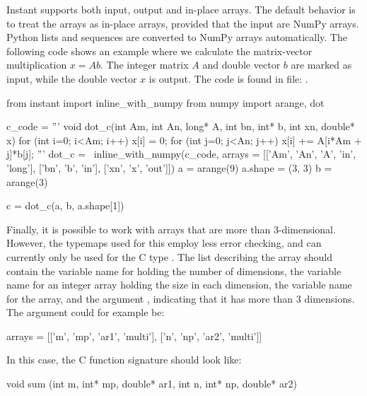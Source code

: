 Instant supports both input, output and in-place arrays. 
The default behavior is to treat the arrays as in-place arrays, provided  
that the input are NumPy arrays. Python lists and sequences are converted to NumPy arrays automatically.  
The following code shows an example where we calculate the matrix-vector
multiplication $x = Ab$. The integer matrix $A$ and double vector $b$ are marked as input, while 
the double vector $x$ is output. The code is found in 
file: . 
\begin{python}
from instant import inline_with_numpy
from numpy import arange, dot

c_code = '''
void dot_c(int Am, int An, long* A, int bn, int* b,
           int xn, double* x)
{
  for (int i=0; i<Am; i++)
  {
    x[i] = 0;
    for (int j=0; j<An; j++)
    {
      x[i] += A[i*Am + j]*b[j];
    }
  }
}
'''
dot_c = \
  inline_with_numpy(c_code,
                    arrays = [['Am', 'An', 'A', 'in', 'long'],
                              ['bn', 'b', 'in'],
                              ['xn', 'x', 'out']])
a = arange(9)
a.shape = (3, 3)
b = arange(3)

c = dot_c(a, b, a.shape[1])
\end{python}


Finally, it is possible to work with arrays that are more than 3-dimensional. 
However, the typemaps used for this employ less error checking, and
can currently only be used for the C type \emp{double}. The list describing the array
should contain the variable name for holding the number of dimensions, the
variable name for an integer array holding the size in each dimension, the
variable name for the array, and the argument \emp{'multi'}, indicating that
it has more than 3 dimensions. The \emp{arrays} argument could for example be:
\begin{python}
arrays = [['m', 'mp', 'ar1', 'multi'],
          ['n', 'np', 'ar2', 'multi']]
\end{python}
In this case, the C function signature should look like:
\begin{python}
void sum (int m, int* mp, double* ar1, int n,
          int* np, double* ar2)
\end{python}



